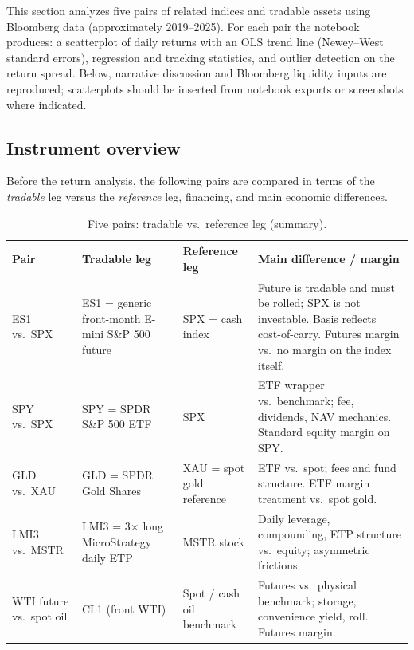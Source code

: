 This section analyzes five pairs of related indices and tradable assets using Bloomberg data (approximately 2019--2025). For each pair the notebook produces: a scatterplot of daily returns with an OLS trend line (Newey--West standard errors), regression and tracking statistics, and outlier detection on the return spread. Below, narrative discussion and Bloomberg liquidity inputs are reproduced; scatterplots should be inserted from notebook exports or screenshots where indicated.

\subsection{Instrument overview}
\label{subsec:pairs-instruments}

Before the return analysis, the following pairs are compared in terms of the \emph{tradable} leg versus the \emph{reference} leg, financing, and main economic differences.

\begin{table}[htbp]
  \centering
  \caption{Five pairs: tradable vs.\ reference leg (summary).}
  \label{tab:pairs-overview}
  \small
  \begin{tabular}{@{}p{} p{} p{} p{}@{}}
    \toprule
    \textbf{Pair} & \textbf{Tradable leg} & \textbf{Reference leg} & \textbf{Main difference / margin} \\
    \midrule
    ES1 vs.\ SPX &
    ES1 = generic front-month E-mini S\&P 500 future &
    SPX = cash index &
    Future is tradable and must be rolled; SPX is not investable. Basis reflects cost-of-carry. Futures margin vs.\ no margin on the index itself. \\
    \addlinespace
    SPY vs.\ SPX &
    SPY = SPDR S\&P 500 ETF &
    SPX &
    ETF wrapper vs.\ benchmark; fee, dividends, NAV mechanics. Standard equity margin on SPY. \\
    \addlinespace
    GLD vs.\ XAU &
    GLD = SPDR Gold Shares &
    XAU = spot gold reference &
    ETF vs.\ spot; fees and fund structure. ETF margin treatment vs.\ spot gold. \\
    \addlinespace
    LMI3 vs.\ MSTR &
    LMI3 = 3$\times$ long MicroStrategy daily ETP &
    MSTR stock &
    Daily leverage, compounding, ETP structure vs.\ equity; asymmetric frictions. \\
    \addlinespace
    WTI future vs.\ spot oil &
    CL1 (front WTI) &
    Spot / cash oil benchmark &
    Futures vs.\ physical benchmark; storage, convenience yield, roll. Futures margin. \\
    \bottomrule
  \end{tabular}
\end{table}

